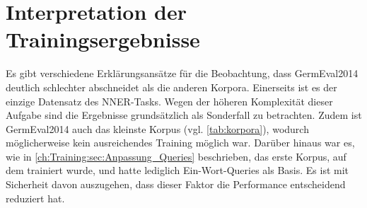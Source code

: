 \begin{table}[!htbp]
	\centering
	\caption{Evaluation des MRC Frameworks}
	\label{tab:evaluation}
\end{table}

\section{Interpretation der Trainingsergebnisse}
\label{ch:Evaluation:sec:Interpretation_der_Trainingsergebnisse}

Es gibt verschiedene Erklärungsansätze für die Beobachtung, dass GermEval2014 deutlich schlechter abschneidet als die anderen Korpora. Einerseits ist es der einzige Datensatz des NNER-Tasks. Wegen der höheren Komplexität dieser Aufgabe sind die Ergebnisse grundsätzlich als Sonderfall zu betrachten. Zudem ist GermEval2014 auch das kleinste Korpus (vgl. \autoref{tab:korpora}), wodurch möglicherweise kein ausreichendes Training möglich war. Darüber hinaus war es, wie in \autoref{ch:Training:sec:Anpassung_Queries} beschrieben, das erste Korpus, auf dem trainiert wurde, und hatte lediglich Ein-Wort-Queries als Basis. Es ist mit Sicherheit davon auszugehen, dass dieser Faktor die Performance entscheidend reduziert hat.

